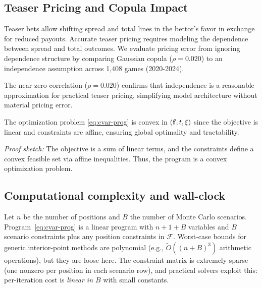 \subsection{Teaser Pricing and Copula Impact}\label{subsec:teaser-copula}
Teaser bets allow shifting spread and total lines in the bettor's favor in exchange for reduced payouts. Accurate teaser pricing requires modeling the dependence between spread and total outcomes. We evaluate pricing error from ignoring dependence structure by comparing Gaussian copula ($\rho=0.020$) to an independence assumption across 1,408 games (2020-2024).


The near-zero correlation ($\rho=0.020$) confirms that independence is a reasonable approximation for practical teaser pricing, simplifying model architecture without material pricing error.

\begin{theorem}
The optimization problem \eqref{eq:cvar-prog} is convex in $(\mathbf{f}, t, \xi)$ since the objective is linear and constraints are affine, ensuring global optimality and tractability.
\end{theorem}

\textit{Proof sketch:} The objective is a sum of linear terms, and the constraints define a convex feasible set via affine inequalities. Thus, the program is a convex optimization problem.

\subsection{Computational complexity and wall-clock}
Let $n$ be the number of positions and $B$ the number of Monte Carlo scenarios. Program~\eqref{eq:cvar-prog} is a linear program with $n+1+B$ variables and $B$ scenario constraints plus any position constraints in $\mathcal{F}$. Worst-case bounds for generic interior-point methods are polynomial (e.g., $\tilde O((n+B)^3)$ arithmetic operations), but they are loose here. The constraint matrix is extremely sparse (one nonzero per position in each scenario row), and practical solvers exploit this: per-iteration cost is \emph{linear in $B$} with small constants.

